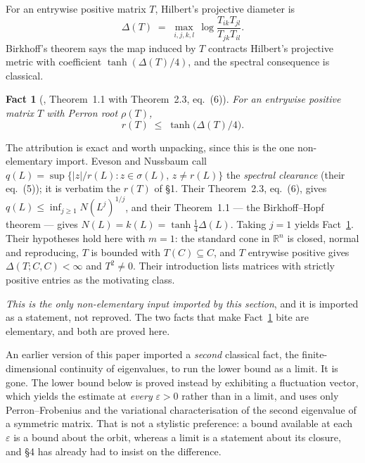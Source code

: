 \documentclass[11pt,a4paper]{article}
\theoremstyle{plain}
\newtheorem{fact}[theorem]{Fact}
\theoremstyle{definition}
\newcommand{\R}{\mathbb{R}}
\begin{document}
For an entrywise positive matrix $T$, Hilbert's projective diameter is
\[
  \Delta(T)\;=\;\max_{i,j,k,l}\,
  \log\frac{T_{ik}T_{jl}}{T_{jk}T_{il}} .
\]
Birkhoff's theorem \cite{birkhoff1957} says the map induced by $T$ contracts
Hilbert's projective metric with coefficient $\tanh(\Delta(T)/4)$, and the
spectral consequence is classical.

\begin{fact}[\cite{evesonnussbaum1995}, Theorem~1.1 with Theorem~2.3,
eq.~(6)]\label{fact:birkhoff}
For an entrywise positive matrix $T$ with Perron root $\rho(T)$,
\[
  r(T)\;\le\;\tanh\!\big(\Delta(T)/4\big).
\]
\end{fact}

The attribution is exact and worth unpacking, since this is the one
non-elementary import. Eveson and Nussbaum call
$q(L)=\sup\{|z|/r(L): z\in\sigma(L),\,z\neq r(L)\}$ the \emph{spectral
clearance} (their eq.~(5)); it is verbatim the $r(T)$ of \S1. Their
Theorem~2.3, eq.~(6), gives $q(L)\le\inf_{j\ge1}N(L^j)^{1/j}$, and their
Theorem~1.1 --- the Birkhoff--Hopf theorem --- gives
$N(L)=k(L)=\tanh\tfrac14\Delta(L)$. Taking $j=1$ yields Fact~\ref{fact:birkhoff}.
Their hypotheses hold here with $m=1$: the standard cone in $\R^n$ is closed,
normal and reproducing, $T$ is bounded with $T(C)\subseteq C$, and $T$ entrywise
positive gives $\Delta(T;C,C)<\infty$ and $T^2\neq0$. Their introduction lists
matrices with strictly positive entries as the motivating class.

\emph{This is the only non-elementary input imported by this section}, and it is
imported as a statement, not reproved. The two facts that make
Fact~\ref{fact:birkhoff} bite are elementary, and both are proved here.

An earlier version of this paper imported a \emph{second} classical fact, the
finite-dimensional continuity of eigenvalues, to run the lower bound as a limit.
It is gone. The lower bound below is proved instead by exhibiting a fluctuation
vector, which yields the estimate at \emph{every} $\varepsilon>0$ rather than in
a limit, and uses only Perron--Frobenius and the variational characterisation of
the second eigenvalue of a symmetric matrix. That is not a stylistic
preference: a bound available at each $\varepsilon$ is a bound about the orbit,
whereas a limit is a statement about its closure, and \S4 has already had to
insist on the difference.
\end{document}
